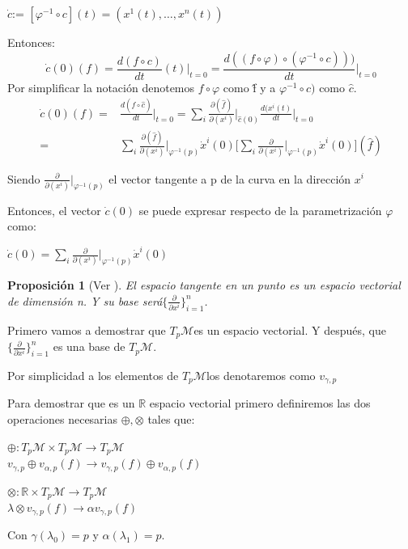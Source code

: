 \documentclass[pdftex,11pt,a4paper]{book}
\newtheorem{propo}{Proposición}
\newcommand{\bproof}{\bigskip {\bf Demostración. }}
\newcommand{\tpm}{$T_p\mathscr{M}$}
\begin{document}
\begin{center}
 $\dot{c}$:= $[\varphi^{-1} \circ c](t)=(x^1(t),\ldots, x^n(t))$ 
\end{center}
Entonces:\\
$$\dot{c}(0)(f)= \frac{d(f \circ c)}{dt}(t)\bigg|_{t=0} = \frac{d((f\circ \varphi) \circ (\varphi^{-1}\circ c)))}{dt}\bigg|_{t=0}$$
Por simplificar la notación denotemos $f\circ \varphi$ como \^{f} y a $ \varphi^{-1}\circ c)$ como $\hat{c}$.
\begin{equation}
    \begin{aligned}
           \dot{c}(0)(f) = & \frac{d(\hat{f}\circ \hat{c})}{dt}\bigg|_{t= 0} =
           \sum_i \frac{\partial(\hat{f})}{\partial(x^i)}\bigg|_{\hat{c}(0)} 
           \frac{d(x^i(t)}{dt}\bigg|_{t=0} \\
           = & \sum_i   \frac{\partial(\hat{f})}{\partial(x^i)}\bigg|_{\varphi^{-1}(p)}\dot{x}^i(0) \bigg[\sum_i \frac{\partial}{\partial(x^i)}\bigg|_{\varphi^{-1}(p)} \dot{x}^i(0)\bigg](\hat{f})
    \end{aligned}
\end{equation}


Siendo $\frac{\partial}{\partial(x^i)}\bigg|_{\varphi^{-1}(p)}$ el vector tangente a p de la curva en la dirección $x^i$

Entonces, el vector $\dot{c}(0)$ se puede expresar respecto de la parametrización $\varphi$ como:
\begin{center}
$\dot{c}(0) = \sum_i \frac{\partial}{\partial(x^i)}\bigg|_{\varphi^{-1}(p)} \dot{x}^i(0) $
\end{center}


\begin{propo}[Ver \cite{WinterSchool}]
El espacio tangente en un punto es un espacio vectorial de dimensión n. Y su base será$\lbrace \frac{\partial}{\partial x^i} \rbrace_{i = 1}^n$.
\end{propo}
\bproof
Primero vamos a demostrar que \tpm es un espacio vectorial. Y después, que  $\lbrace \frac{\partial}{\partial x^i} \rbrace_{i = 1}^n$ es una base de \tpm .

Por simplicidad a los elementos de \tpm los denotaremos como $v_{\gamma, p}$

Para demostrar que es un $\mathbb{R}$ espacio vectorial primero definiremos las dos operaciones necesarias $\oplus, \otimes$ tales que: 
\begin{center}
	$\oplus: T_p\mathscr{M} \times T_p\mathscr{M} \to T_p\mathscr{M}$\\
		$v_{\gamma,p}\oplus v_{\alpha, p}(f) \to v_{\gamma,p}(f) \oplus v_{\alpha, p}(f)$ \\
\end{center}
\begin{center}
	$\otimes: \mathds{R} \times T_p\mathscr{M}  \to T_p\mathscr{M} $ \\
		$\lambda \otimes v_{\gamma,p}(f) \to \alpha v_{\gamma,p}(f)$ 
\end{center}
Con $\gamma(\lambda_0) = p$ y $\alpha(\lambda_1) = p$.
\end{document}
